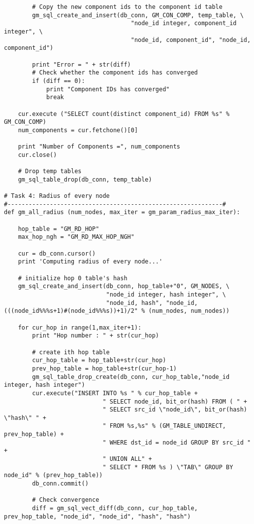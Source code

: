\begin{lstlisting}
        # Copy the new component ids to the component id table
        gm_sql_create_and_insert(db_conn, GM_CON_COMP, temp_table, \
                                    "node_id integer, component_id integer", \
                                    "node_id, component_id", "node_id, component_id")

        print "Error = " + str(diff)
        # Check whether the component ids has converged
        if (diff == 0):
            print "Component IDs has converged"
            break

    cur.execute ("SELECT count(distinct component_id) FROM %s" % GM_CON_COMP)
    num_components = cur.fetchone()[0]

    print "Number of Components =", num_components
    cur.close()

    # Drop temp tables
    gm_sql_table_drop(db_conn, temp_table)

# Task 4: Radius of every node
#-------------------------------------------------------------#
def gm_all_radius (num_nodes, max_iter = gm_param_radius_max_iter):

    hop_table = "GM_RD_HOP"
    max_hop_ngh = "GM_RD_MAX_HOP_NGH"

    cur = db_conn.cursor()
    print 'Computing radius of every node...'

    # initialize hop 0 table's hash
    gm_sql_create_and_insert(db_conn, hop_table+"0", GM_NODES, \
                             "node_id integer, hash integer", \
                             "node_id, hash", "node_id, (((node_id%%%s+1)#(node_id%%%s))+1)/2" % (num_nodes, num_nodes))

    for cur_hop in range(1,max_iter+1):
        print "Hop number : " + str(cur_hop)

        # create ith hop table
        cur_hop_table = hop_table+str(cur_hop)
        prev_hop_table = hop_table+str(cur_hop-1)
        gm_sql_table_drop_create(db_conn, cur_hop_table,"node_id integer, hash integer")
        cur.execute("INSERT INTO %s " % cur_hop_table +
                            " SELECT node_id, bit_or(hash) FROM ( " +
                            " SELECT src_id \"node_id\", bit_or(hash) \"hash\" " +
                            " FROM %s,%s" % (GM_TABLE_UNDIRECT, prev_hop_table) +
                            " WHERE dst_id = node_id GROUP BY src_id " +
                            " UNION ALL" +
                            " SELECT * FROM %s ) \"TAB\" GROUP BY node_id" % (prev_hop_table))
        db_conn.commit()

        # Check convergence
        diff = gm_sql_vect_diff(db_conn, cur_hop_table, prev_hop_table, "node_id", "node_id", "hash", "hash")


\end{lstlisting}
